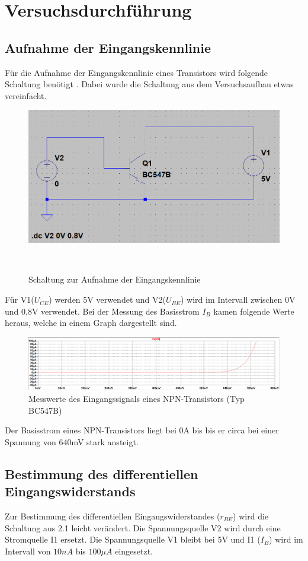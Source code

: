 \chapter{Versuchsdurchführung}
    \section{Aufnahme der Eingangskennlinie}
        Für die Aufnahme der Eingangskennlinie  eines Transistors wird folgende Schaltung benötigt . 
        Dabei wurde die Schaltung aus dem Versuchsaufbau etwas vereinfacht.

        \begin{figure}[!ht]
            \centering
            \includegraphics[width=0.5\linewidth]{Bilder/21aufbau.PNG}
            \caption{Schaltung zur Aufnahme der Eingangskennlinie}
            ~\label{fig:21}
        \end{figure}

        Für V1(\(U_{CE}\)) werden 5V verwendet und V2(\(U_{BE}\)) wird im Intervall zwischen 0V und 0,8V verwendet. Bei der Messung des Basisstrom \(I_B\) kamen folgende Werte heraus, welche in einem Graph dargestellt sind.

        \begin{figure}[!ht]
            \centering
                \includegraphics[width=\linewidth]{Bilder/21graph.PNG}
            \caption{Messwerte des Eingangssignals eines NPN-Transistors (Typ BC547B)}
        \end{figure}

        Der Basisstrom eines NPN-Transistors liegt bei 0A bis bis er circa bei einer Spannung von 640mV stark ansteigt.

        \newpage
    \section{Bestimmung des differentiellen Eingangswiderstands}
        Zur Bestimmung des differentiellen Eingangswiderstandes (\(r_{BE}\)) wird die Schaltung aus 2.1 leicht verändert. Die Spannungsquelle V2 wird durch eine Stromquelle I1 ersetzt. Die Spannungsquelle V1 bleibt bei 5V und I1 (\(I_B\)) wird im Intervall von \(10nA\) bis \(100\mu A\) eingesetzt. 

